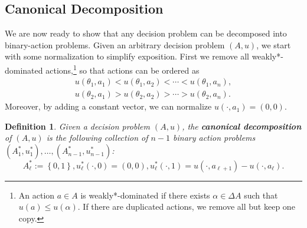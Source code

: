 \documentclass[11pt]{article}
\theoremstyle{plain}
\newtheorem{defn}{Definition}
\theoremstyle{remark}
\begin{document}
\subsection{Canonical Decomposition}\label{sec:canonical}

We are now ready to show that any decision problem can be decomposed into binary-action problems. Given an arbitrary decision problem $(A,u)$, we start with some normalization to simplify exposition. First we remove all weakly*-dominated actions,\footnote{An action $a\in A$ is weakly*-dominated if there exists $\alpha\in \Delta A$ such that $u(a)\leq u(\alpha)$. If there are duplicated actions, we remove all but keep one copy.} so that actions can be ordered as
\begin{align*}
 u(\theta_1,a_1) < u(\theta_1,a_2) < \cdots < u(\theta_1,a_n),\\
 u(\theta_2,a_1) > u(\theta_2,a_2) > \cdots > u(\theta_2,a_n).
\end{align*}
Moreover, by adding a constant vector, we can normalize $u(\cdot,a_1)=(0,0)$. 



\begin{defn}
Given a decision problem $(A, u)$, the \textbf{canonical decomposition} of $(A, u)$ is the following collection of $n - 1$ binary action problems $(A_1^*, u_1^*), \ldots , (A_{n - 1}^*, u_{n-1}^*)$:
\[
A_{\ell}^* := \left\{0, 1 \right\}, u_\ell^*(\cdot,0) = (0,0), u_\ell^*(\cdot,1) = u(\cdot,a_{\ell + 1}) - u(\cdot,a_{\ell}).
\]
\end{defn}
\end{document}

